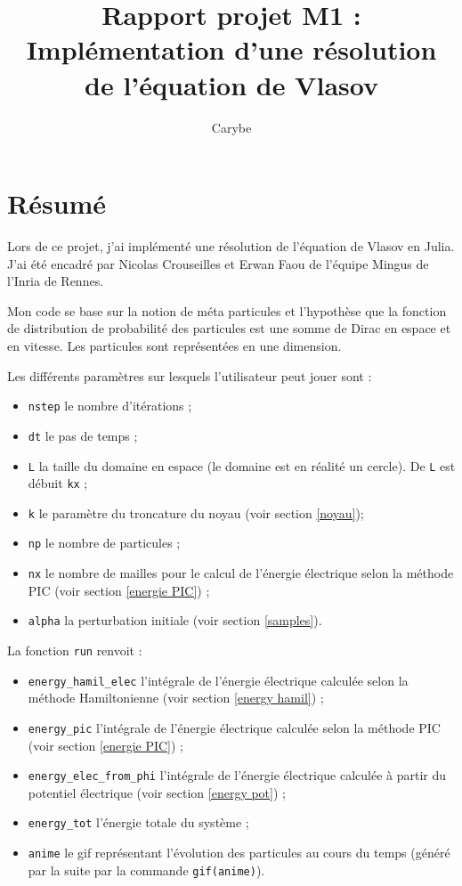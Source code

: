 \documentclass[a4paper,11pt]{article}
\title{Rapport projet M1 :\\Implémentation d'une résolution de l'équation de Vlasov}
\author{Carybe \bsc{Bégué}}
\newcommand{\Python}[1]{\texttt{#1}}
\begin{document}
\maketitle


\section{Résumé}

Lors de ce projet, j'ai implémenté une résolution de l'équation de Vlasov en Julia. J'ai été encadré par Nicolas Crouseilles et Erwan Faou de l'équipe Mingus de l'Inria de Rennes.

Mon code se base sur la notion de méta particules et l'hypothèse que la fonction de distribution de probabilité des particules est une somme de Dirac en espace et en vitesse. Les particules sont représentées en une dimension. 

Les différents paramètres sur lesquels l'utilisateur peut jouer sont :
\begin{itemize}
	\item \Python{nstep} le nombre d'itérations ;
	\item \Python{dt} le pas de temps ;
	\item \Python{L} la taille du domaine en espace (le domaine est en réalité un cercle). De \Python{L} est débuit \Python{kx} ;
	\item \Python{k} le paramètre du troncature du noyau (voir section \ref{noyau});
	\item \Python{np} le nombre de particules ;
	\item \Python{nx} le nombre de mailles pour le calcul de l'énergie électrique selon la méthode PIC (voir section \ref{energie PIC}) ;
	\item \Python{alpha} la perturbation initiale (voir section \ref{samples}).
\end{itemize}

La fonction \Python{run} renvoit :
\begin{itemize}
	\item \Python{energy_hamil_elec} l'intégrale de l'énergie électrique calculée selon la méthode Hamiltonienne (voir section \ref{energy hamil}) ;
	\item \Python{energy_pic} l'intégrale de l'énergie électrique calculée selon la méthode PIC (voir section \ref{energie PIC}) ;
	\item \Python{energy_elec_from_phi} l'intégrale de l'énergie électrique calculée à partir du potentiel électrique (voir section \ref{energy pot}) ;
	\item \Python{energy_tot} l'énergie totale du système ;
	\item \Python{anime} le gif représentant l'évolution des particules au cours du temps (généré par la suite par la commande \Python{gif(anime)}).
\end{itemize}
\end{document}
